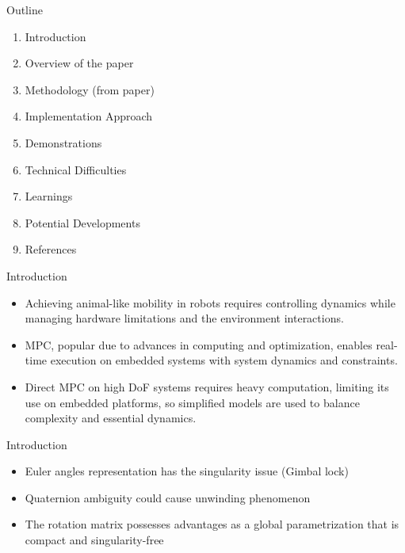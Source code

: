 \documentclass{beamer}
\begin{document}
\begin{frame}\titlepage\end{frame}\normalfont


\begin{frame}{Outline}
	\begin{enumerate}
            \item Introduction
		\item Overview of the paper
            \item Methodology (from paper)
            \item Implementation Approach
            \item Demonstrations
            \item Technical Difficulties
            \item Learnings
            \item Potential Developments
            \item References
	\end{enumerate}
\end{frame}\normalfont

\begin{frame}{Introduction}
\begin{itemize}
  \item Achieving animal-like mobility in robots requires controlling dynamics while managing hardware limitations and the environment interactions.
  \item MPC, popular due to advances in computing and optimization, enables real-time execution on embedded systems with system dynamics and constraints.
  \item Direct MPC on high DoF systems requires heavy computation, limiting its use on embedded platforms, so simplified models are used to balance complexity and essential dynamics.
\end{itemize}

\end{frame}\normalfont

\begin{frame}{Introduction}
\begin{itemize}
  \item Euler angles representation has the singularity issue (Gimbal lock)
  \item Quaternion ambiguity could cause unwinding phenomenon
  \item The rotation matrix possesses advantages as a global parametrization that is compact and singularity-free 
\end{itemize}

\end{frame}\normalfont
\end{document}
